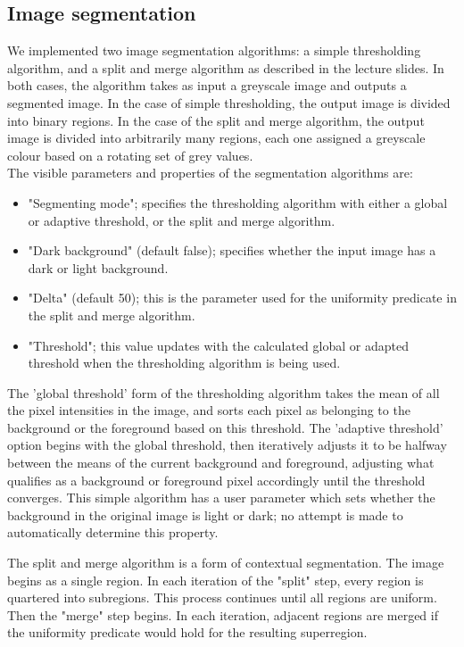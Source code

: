 \subsection{Image segmentation}
\label{sec:segmentation}

We implemented two image segmentation algorithms: a simple thresholding algorithm, and a split and merge algorithm as described in the lecture slides. In both cases, the algorithm takes as input a greyscale image and outputs a segmented image. In the case of simple thresholding, the output image is divided into binary regions. In the case of the split and merge algorithm, the output image is divided into arbitrarily many regions, each one assigned a greyscale colour based on a rotating set of grey values.\\

The visible parameters and properties of the segmentation algorithms are:
\begin{itemize}
\item "Segmenting mode"; specifies the thresholding algorithm with either a global or adaptive threshold, or the split and merge algorithm.
\item "Dark background" (default false); specifies whether the input image has a dark or light background.
\item "Delta" (default 50); this is the parameter used for the uniformity predicate in the split and merge algorithm.
\item "Threshold"; this value updates with the calculated global or adapted threshold when the thresholding algorithm is being used.\\
\end{itemize}

The 'global threshold' form of the thresholding algorithm takes the mean of all the pixel intensities in the image, and sorts each pixel as belonging to the background or the foreground based on this threshold. The 'adaptive threshold' option begins with the global threshold, then iteratively adjusts it to be halfway between the means of the current background and foreground, adjusting what qualifies as a background or foreground pixel accordingly until the threshold converges. This simple algorithm has a user parameter which sets whether the background in the original image is light or dark; no attempt is made to automatically determine this property.

The split and merge algorithm is a form of contextual segmentation. The image begins as a single region. In each iteration of the "split" step, every region is quartered into subregions. This process continues until all regions are uniform. Then the "merge" step begins. In each iteration, adjacent regions are merged if the uniformity predicate would hold for the resulting superregion.

